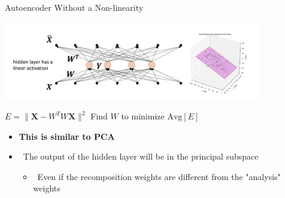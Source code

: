 \documentclass[serif, aspectratio=169]{beamer}
\begin{document}
\begin{frame}{Autoencoder Without a Non-linearity}
    
    \begin{center}
        \includegraphics[width=0.85\textwidth]{pic/AE without non-linearity.png}
    \end{center}
    
    
\begin{center}
     \hspace{0.5cm} 
     \hspace{0.5cm}
    \textbf{\textcolor{deepred}{\( E = \| \mathbf{X} - W^{T} W \mathbf{X} \|^2 \)}} \hspace{0.5cm}
    \footnotesize{Find \(W\) to minimize \(\text{Avg}[E]\)}
\end{center}

        
    \begin{itemize}
        \item \textbf{This is similar to PCA}
        \item[] \textendash \ The output of the hidden layer will be in the principal subspace
        \begin{itemize}
            \item[] \textbullet \ Even if the recomposition weights are different from the "analysis" weights
        \end{itemize}
    \end{itemize}
\end{frame}
\end{document}
